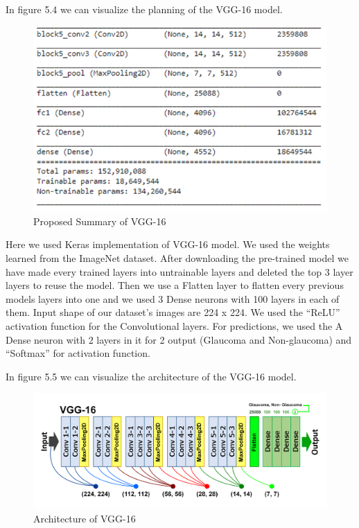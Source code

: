 \vspace{5mm}
\noindent In figure 5.4 we can visualize the planning of the VGG-16 model.


\vspace{5mm}
\begin{figure}[hbt!]
\centering
\includegraphics[scale=0.5]{images/fig-8.png}
\caption{Proposed Summary of VGG-16}
\label{fig:x Proposed Summary of VGG-16}
\end{figure}

\vspace{5mm}
\noindent Here we used Keras implementation of VGG-16 model. We used the weights learned from the ImageNet dataset. After downloading the pre-trained model we have made every trained layers into untrainable layers and deleted the top 3 layer layers to reuse the model. Then we use a Flatten layer to flatten every previous models layers into one and we used 3 Dense neurons with 100 layers in each of them. Input shape of our dataset's images are 224 x 224. We used the “ReLU” activation function for the Convolutional layers. For predictions, we used the A Dense neuron with 2 layers in it for 2 output (Glaucoma and Non-glaucoma) and “Softmax” for activation function.

\vspace{5mm}
\noindent In figure 5.5 we can visualize the architecture of the VGG-16  model.

\vspace{5mm}
\begin{figure}[hbt!]
\centering
\includegraphics[scale=0.75]{images/Architecture of VGG-16.png}
\caption{Architecture of VGG-16}
\label{fig:x Architecture of VGG-16}
\end{figure}

